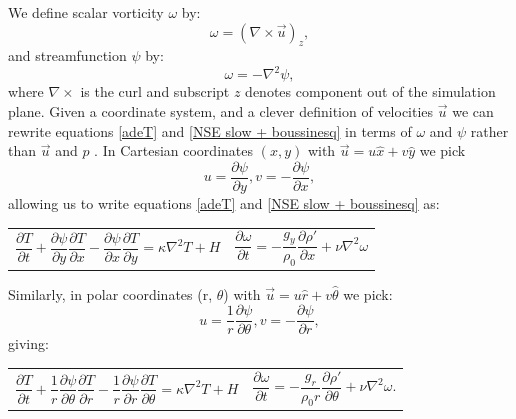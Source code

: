 \documentclass{article}
\begin{document}
\noindent We define scalar vorticity $\omega$ by:
\begin{equation}
	\omega = (\nabla \times \vec{u})_z,
	\label{omega}
\end{equation}
and streamfunction $\psi$ by:
\begin{equation}
	\omega = - \nabla^2 \psi,
	\label{psi}
\end{equation}
where $\nabla \times$ is the curl and subscript $z$ denotes component out of the simulation plane. Given a coordinate system, and a clever definition of velocities $\vec{u}$ we can rewrite equations \ref{adeT} and \ref{NSE slow + boussinesq} in terms of $\omega$ and $\psi$ rather than $\vec{u}$ and $p$ \cite{tritton2012physical}. In Cartesian coordinates $(x,y)$ with $\vec{u} = u \hat{x} + v \hat{y}$ we pick 
\begin{equation}
	u = \frac{\partial \psi}{\partial y}, v = -\frac{\partial \psi}{\partial x},
	\label{cartesian velocities}
\end{equation}
allowing us to write equations \ref{adeT} and \ref{NSE slow + boussinesq} as:
\newline
\begin{tabularx}{\textwidth}{XX}
\begin{equation}
	\frac{\partial T}{\partial t} + \frac{\partial \psi}{\partial y} \frac{\partial T}{\partial x} - \frac{\partial \psi}{\partial x} \frac{\partial T}{\partial y} = \kappa \nabla^2 T + H
	\label{adeT sfvt cartesian}
\end{equation}
    &
\begin{equation}
	\frac{\partial \omega}{\partial t} = -\frac{g_y}{\rho_0} \frac{\partial \rho'}{\partial x} + \nu \nabla^2 \omega
	\label{NSE slow + boussinesq sfvt cartesian}
\end{equation}
\end{tabularx}\par
\noindent Similarly, in polar coordinates (r, $\theta$) with $\vec{u} = u \hat{r} + v \hat{\theta}$ we pick:
\begin{equation}
	u = \frac{1}{r} \frac{\partial \psi}{\partial \theta}, v = -\frac{\partial \psi}{\partial r},
	\label{polar velocities}
\end{equation}
giving:
\newline
\begin{tabularx}{\textwidth}{XX}
\begin{equation}
	\frac{\partial T}{\partial t} + \frac{1}{r} \frac{\partial \psi}{\partial \theta} \frac{\partial T}{\partial r} - \frac{1}{r} \frac{\partial \psi}{\partial r} \frac{\partial T}{\partial \theta} = \kappa \nabla^2 T + H
	\label{adeT sfvt polar}
\end{equation}
    &
\begin{equation}
	\frac{\partial \omega}{\partial t} = - \frac{g_r}{\rho_0 r} \frac{\partial \rho'}{\partial \theta} +\nu \nabla^2 \omega.
	\label{NSE slow + boussinesq sfvt polar}
\end{equation}
\end{tabularx}\par
\end{document}
